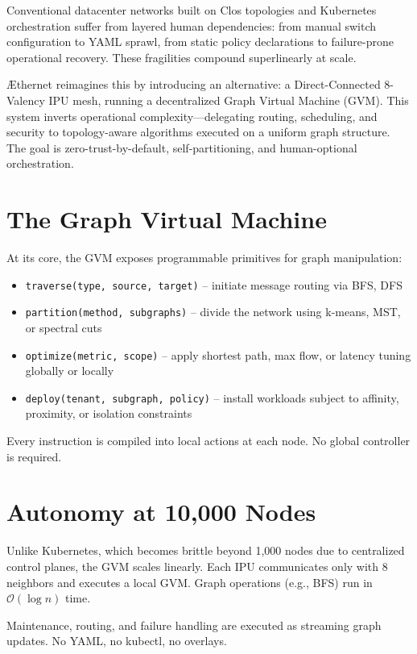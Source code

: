 Conventional datacenter networks built on Clos topologies and Kubernetes orchestration suffer from layered human dependencies: from manual switch configuration to YAML sprawl, from static policy declarations to failure-prone operational recovery. These fragilities compound superlinearly at scale.

\AE thernet reimagines this by introducing an alternative: a Direct-Connected 8-Valency IPU mesh, running a decentralized Graph Virtual Machine (GVM). This system inverts operational complexity—delegating routing, scheduling, and security to topology-aware algorithms executed on a uniform graph structure. The goal is zero-trust-by-default, self-partitioning, and human-optional orchestration.

\section{The Graph Virtual Machine}

At its core, the GVM exposes programmable primitives for graph manipulation:

\begin{itemize}
  \item \texttt{traverse(type, source, target)} – initiate message routing via BFS, DFS
  \item \texttt{partition(method, subgraphs)} – divide the network using k-means, MST, or spectral cuts
  \item \texttt{optimize(metric, scope)} – apply shortest path, max flow, or latency tuning globally or locally
  \item \texttt{deploy(tenant, subgraph, policy)} – install workloads subject to affinity, proximity, or isolation constraints
\end{itemize}

Every instruction is compiled into local actions at each node. No global controller is required.

\section{Autonomy at 10,000 Nodes}

Unlike Kubernetes, which becomes brittle beyond 1,000 nodes due to centralized control planes, the GVM scales linearly. Each IPU communicates only with 8 neighbors and executes a local GVM. Graph operations (e.g., BFS) run in \(\mathcal{O}(\log n)\) time. 

Maintenance, routing, and failure handling are executed as streaming graph updates. No YAML, no kubectl, no overlays.

